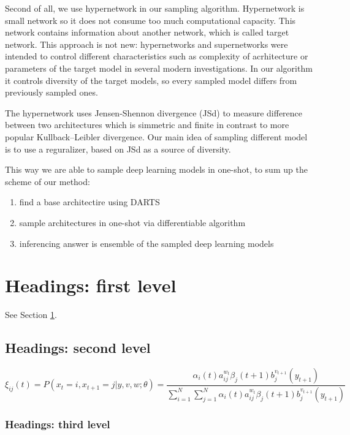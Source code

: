 \documentclass{article}
\begin{document}
Second of all, we use hypernetwork in our sampling algorithm. Hypernetwork is small network so it does not
consume too much computational capacity. This network contains information about another network, which is called target network.
This approach is not new: hypernetworks and supernetworks were intended to control different characteristics such as
complexity of acrhitecture or parameters of the target model in several modern investigations. In our algorithm it controls 
diversity of the target models, so every sampled model differs from previously sampled ones.

The hypernetwork uses Jensen-Shennon divergence (JSd) to measure difference between two architectures which is simmetric and finite
in contrast to more popular Kullback–Leibler divergence. Our main idea of sampling different model is to use a reguralizer,
based on JSd as a source of diversity.

This way we are able to sample deep learning models in one-shot, to sum up the scheme of our method:
\begin{enumerate} 
    \item find a base architectire using DARTS
    \item sample architectures in one-shot via differentiable algorithm
    \item inferencing answer is ensemble of the sampled deep learning models
\end{enumerate}


\section{Headings: first level}
\label{sec:headings}

\lipsum[4] See Section \ref{sec:headings}.

\subsection{Headings: second level}
\lipsum[5]
\begin{equation}
	\xi _{ij}(t)=P(x_{t}=i,x_{t+1}=j|y,v,w;\theta)= {\frac {\alpha _{i}(t)a^{w_t}_{ij}\beta _{j}(t+1)b^{v_{t+1}}_{j}(y_{t+1})}{\sum _{i=1}^{N} \sum _{j=1}^{N} \alpha _{i}(t)a^{w_t}_{ij}\beta _{j}(t+1)b^{v_{t+1}}_{j}(y_{t+1})}}
\end{equation}

\subsubsection{Headings: third level}
\lipsum[6]
\end{document}
